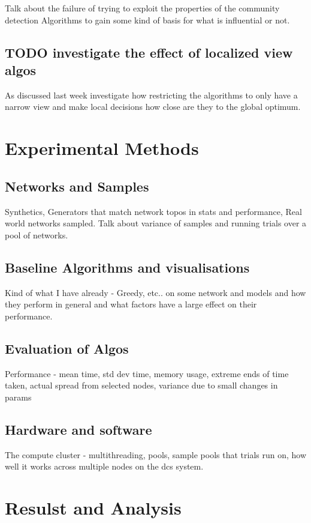 \documentclass{article}
\begin{document}
Talk about the failure of trying to exploit the properties of the community detection Algorithms to gain some kind of basis for what is influential or not.

\subsection{TODO investigate the effect of localized view algos}
As discussed last week investigate how restricting the algorithms to only have a narrow view and make local decisions how close are they to the global optimum.

\section{Experimental Methods}

\subsection{Networks and Samples}
Synthetics, Generators that match network topos in stats and performance, Real world networks sampled.
Talk about variance of samples and running trials over a pool of networks.

\subsection{Baseline Algorithms and visualisations}
Kind of what I have already - Greedy, etc.. on some network and models and how they perform in general and what factors have a large effect on their performance.

\subsection{Evaluation of Algos}
Performance - mean time, std dev time, memory usage, extreme ends of time taken, actual spread from selected nodes, variance due to small changes in params

\subsection{Hardware and software}
The compute cluster - multithreading, pools, sample pools that trials run on, how well it works across multiple nodes on the dcs system.

\section{Resulst and Analysis}
\end{document}
